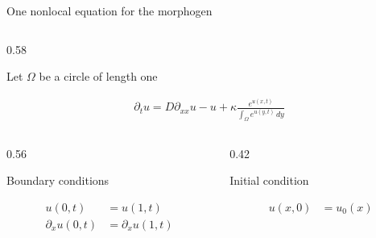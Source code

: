 \begin{frame}{One nonlocal equation for the morphogen}

  \vspace{-0.04cm}

  \begin{columns}[c,onlytextwidth]
    \begin{column}{0.58\textwidth}
      {\color{HydraWhite}\fontsize{8.6}{10.8}\selectfont
        Let $\Omega$ be a circle of length one
      \par}
      \vspace{0.14cm}
      {\color{HydraGold}\bfseries\fontsize{11.4}{14.4}\selectfont
      \begin{align*}
        \boxed{
          \partial_tu
          =D\partial_{xx}u-u
          +\kappa
          \frac{e^{u(x,t)}}
          {\displaystyle\int_\Omega e^{u(y,t)}\,dy}
        }
      \end{align*}
      }
      \par
      \vspace{-0.14cm}
      \begin{columns}[t,onlytextwidth]
        \begin{column}{0.56\textwidth}
          \centering
          {\color{HydraMuted}\fontsize{6.8}{8.4}\selectfont
            Boundary conditions
          \par}
          \vspace{-0.30cm}
          {\color{HydraWhite}\fontsize{8}{10.2}\selectfont
          \begin{align*}
            u(0,t)&=u(1,t)
            \\
            \partial_xu(0,t)&=\partial_xu(1,t)
          \end{align*}
          }
        \end{column}

        \begin{column}{0.42\textwidth}
          \centering
          {\color{HydraMuted}\fontsize{6.8}{8.4}\selectfont
            Initial condition
          \par}
          \vspace{-0.30cm}
          {\color{HydraWhite}\fontsize{8}{10.2}\selectfont
          \begin{align*}
            u(x,0)&=u_0(x)
          \end{align*}
          }
        \end{column}
      \end{columns}
    \end{column}


\end{columns}
\end{frame}
